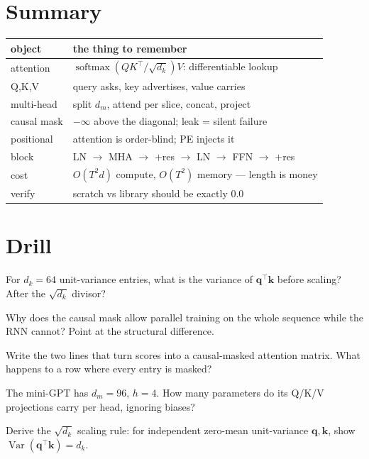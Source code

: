 \section{Summary}
\label{sec:attnsummary}

\begin{center}\small
\begin{tabular}{p{}p{}}
\toprule
object & the thing to remember \\
\midrule
attention & $\operatorname{softmax}(QK^\top/\sqrt{d_k})V$:
differentiable lookup \\
Q,K,V & query asks, key advertises, value carries \\
multi-head & split $d_m$, attend per slice, concat, project \\
causal mask & $-\infty$ above the diagonal; leak = silent failure \\
positional & attention is order-blind; PE injects it \\
block & LN $\to$ MHA $\to$ $+$res $\to$ LN $\to$ FFN $\to$ $+$res \\
cost & $O(T^2d)$ compute, $O(T^2)$ memory --- length is money \\
verify & scratch vs library should be exactly 0.0 \\
\bottomrule
\end{tabular}
\end{center}

\section*{Drill}
\begin{exercise}[{[easy]}]
For $d_k=64$ unit-variance entries, what is the variance of
$\mathbf q^\top\mathbf k$ before scaling? After the $\sqrt{d_k}$
divisor?
\end{exercise}
\begin{exercise}[{[easy]}]
Why does the causal mask allow parallel training on the whole
sequence while the RNN cannot? Point at the structural difference.
\end{exercise}
\begin{exercise}[{[medium]}]
Write the two lines that turn scores into a causal-masked attention
matrix. What happens to a row where every entry is masked?
\end{exercise}
\begin{exercise}[{[medium]}]
The mini-GPT has $d_m{=}96$, $h{=}4$. How many parameters do its
Q/K/V projections carry per head, ignoring biases?
\end{exercise}
\begin{exercise}[{[hard]}]
Derive the $\sqrt{d_k}$ scaling rule: for independent
zero-mean unit-variance $\mathbf q,\mathbf k$, show
$\operatorname{Var}(\mathbf q^\top\mathbf k)=d_k$.
\end{exercise}

